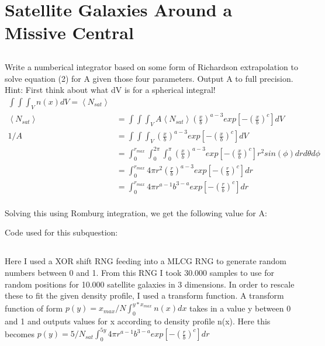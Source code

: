 \section{Satellite Galaxies Around a Missive Central}

\subsection{}
Write a numberical integrator based on some form of Richardson
extrapolation to solve equation (2) for A given those four parameters. Output A to full precision.
Hint: First think about what dV is for a spherical integral!
\\
\begin{align}
    \int \int \int _V n(x) dV = \left< N_{sat} \right>\\
    \left< N_{sat} \right> &= \int \int \int _V A \left< N_{sat} \right> \left( \frac{x}{b} \right)^{a-3} exp\left[-\left(\frac{x}{b}\right)^c\right] dV \\
    1 / A &= \int \int \int _V \left( \frac{x}{b} \right)^{a-3} exp\left[-\left(\frac{x}{b}\right)^c\right] dV \\
    &= \int_0^{r_{max}} \int_0^{2 \pi} \int_0^{\pi} \left( \frac{x}{b} \right)^{a-3} exp\left[-\left(\frac{x}{b}\right)^c\right] r^2 sin(\phi) dr d\theta d\phi \\
    &= \int_0^{r_{max}} 4 \pi r^2 \left( \frac{r}{b} \right)^{a-3} exp\left[-\left(\frac{r}{b}\right)^c\right] dr \\
    &= \int_0^{r_{max}} 4 \pi r^{a-1} b^{3-a} exp\left[-\left(\frac{r}{b}\right)^c\right] dr \\
\end{align}

Solving this using Romburg integration, we get the following value for A:

\noindent
Code used for this subquestion:



\subsection{}
Here I used a XOR shift RNG feeding into a MLCG RNG to generate random numbers between 0 and 1.
From this RNG I took 30.000 samples to use for random positions for 10.000 satellite galaxies in 3 dimensions.
In order to rescale these to fit the given density profile, I used a transform function.
A transform function of form $p(y) = x_{max}/N \int^{y*x_{max}}_0 n(x) dx$ takes in a value y between 0 and 1 and outputs values for x according to density profile n(x).
Here this becomes $p(y) = 5/N_{sat} \int_0^{5y} 4 \pi r^{a-1} b^{3-a} exp\left[-\left(\frac{r}{b}\right)^c\right] dr$